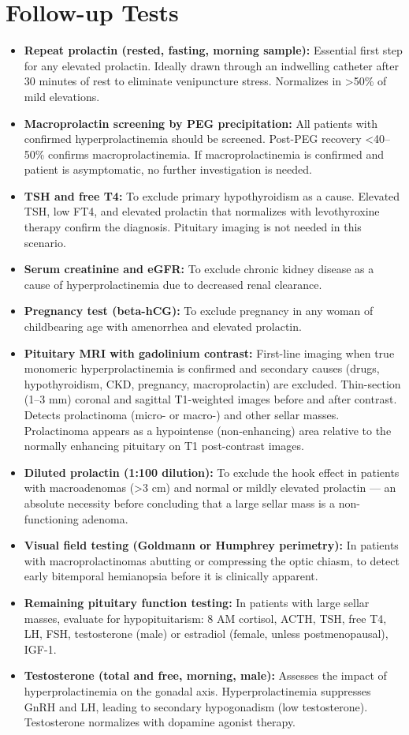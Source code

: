 \section*{Follow-up Tests}
\begin{itemize}
  \item \textbf{Repeat prolactin (rested, fasting, morning sample):} Essential first step for any elevated prolactin. Ideally drawn through an indwelling catheter after 30 minutes of rest to eliminate venipuncture stress. Normalizes in >50\% of mild elevations.
  \item \textbf{Macroprolactin screening by PEG precipitation:} All patients with confirmed hyperprolactinemia should be screened. Post-PEG recovery <40--50\% confirms macroprolactinemia. If macroprolactinemia is confirmed and patient is asymptomatic, no further investigation is needed.
  \item \textbf{TSH and free T4:} To exclude primary hypothyroidism as a cause. Elevated TSH, low FT4, and elevated prolactin that normalizes with levothyroxine therapy confirm the diagnosis. Pituitary imaging is not needed in this scenario.
  \item \textbf{Serum creatinine and eGFR:} To exclude chronic kidney disease as a cause of hyperprolactinemia due to decreased renal clearance.
  \item \textbf{Pregnancy test (beta-hCG):} To exclude pregnancy in any woman of childbearing age with amenorrhea and elevated prolactin.
  \item \textbf{Pituitary MRI with gadolinium contrast:} First-line imaging when true monomeric hyperprolactinemia is confirmed and secondary causes (drugs, hypothyroidism, CKD, pregnancy, macroprolactin) are excluded. Thin-section (1--3 mm) coronal and sagittal T1-weighted images before and after contrast. Detects prolactinoma (micro- or macro-) and other sellar masses. Prolactinoma appears as a hypointense (non-enhancing) area relative to the normally enhancing pituitary on T1 post-contrast images.
  \item \textbf{Diluted prolactin (1:100 dilution):} To exclude the hook effect in patients with macroadenomas (>3 cm) and normal or mildly elevated prolactin --- an absolute necessity before concluding that a large sellar mass is a non-functioning adenoma.
  \item \textbf{Visual field testing (Goldmann or Humphrey perimetry):} In patients with macroprolactinomas abutting or compressing the optic chiasm, to detect early bitemporal hemianopsia before it is clinically apparent.
  \item \textbf{Remaining pituitary function testing:} In patients with large sellar masses, evaluate for hypopituitarism: 8 AM cortisol, ACTH, TSH, free T4, LH, FSH, testosterone (male) or estradiol (female, unless postmenopausal), IGF-1.
  \item \textbf{Testosterone (total and free, morning, male):} Assesses the impact of hyperprolactinemia on the gonadal axis. Hyperprolactinemia suppresses GnRH and LH, leading to secondary hypogonadism (low testosterone). Testosterone normalizes with dopamine agonist therapy.
\end{itemize}

